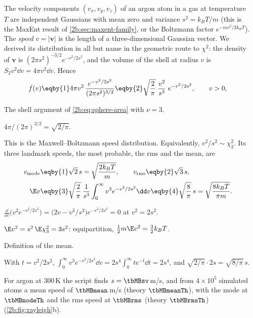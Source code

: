 The velocity components $(v_x,v_y,v_z)$ of an argon atom in a gas at temperature $T$ are independent Gaussians with mean zero and variance $s^2=k_BT/m$ (this is the MaxEnt result of \cref{2b:sec:maxent-family}, or the Boltzmann factor $e^{-mv^2/2k_BT}$). The \emph{speed} $v=|\bm v|$ is the length of a three-dimensional Gaussian vector. We derived its distribution in all but name in the geometric route to $\chi^2$: the density of $\bm v$ is $(2\pi s^2)^{-3/2}e^{-v^2/2s^2}$, and the volume of the shell at radius $v$ is $S_2v^2\dd v=4\pi v^2\dd v$. Hence
\begin{equation}
  f(v)\eqby{1}4\pi v^2\,\frac{e^{-v^2/2s^2}}{(2\pi s^2)^{3/2}}\eqby{2}\sqrt{\frac2\pi}\;\frac{v^2}{s^3}\;e^{-v^2/2s^2},\qquad v>0 ,
  \label{2b:eq:maxwell}
\end{equation}
\begin{explain}
  \item The shell argument of \eqref{2b:eq:sphere-area} with $\nu=3$.
  \item $4\pi/(2\pi)^{3/2}=\sqrt{2/\pi}$.
\end{explain}
This is the Maxwell--Boltzmann speed distribution. Equivalently, $v^2/s^2\sim\chi^2_3$. Its three landmark speeds, the most probable, the rms and the mean, are
\begin{align}
  v_{\mathrm{mode}}&\eqby{1}\sqrt2\,s=\sqrt{\frac{2k_BT}{m}},\qquad
  v_{\mathrm{rms}}\eqby{2}\sqrt3\,s , \nonumber\\
  \E v&\eqby{3}\sqrt{\frac2\pi}\,\frac{1}{s^3}\int_0^\infty v^3e^{-v^2/2s^2}\dd v\eqby{4}\sqrt{\frac8\pi}\,s=\sqrt{\frac{8k_BT}{\pi m}} .
  \label{2b:eq:maxwell-moments}
\end{align}
\begin{explain}
  \item $\frac{\dd}{\dd v}\bigl(v^2e^{-v^2/2s^2}\bigr)=\bigl(2v-v^3/s^2\bigr)e^{-v^2/2s^2}=0$ at $v^2=2s^2$.
  \item $\E v^2=s^2\,\E\chi^2_3=3s^2$: equipartition, $\frac12m\E v^2=\frac32k_BT$.
  \item Definition of the mean.
  \item With $t=v^2/2s^2$, $\int_0^\infty v^3e^{-v^2/2s^2}\dd v=2s^4\int_0^\infty te^{-t}\dd t=2s^4$, and $\sqrt{2/\pi}\cdot2s=\sqrt{8/\pi}\,s$.
\end{explain}
For argon at $300$\,K the script finds $s=\tbMBsv$\,m/s, and from $4\times10^5$ simulated atoms a mean speed of $\tbMBmean$\,m/s (theory $\tbMBmeanTh$), with the mode at $\tbMBmodeTh$ and the rms speed at $\tbMBrms$ (theory $\tbMBrmsTh$) (\cref{2b:fig:rayleigh}b).

